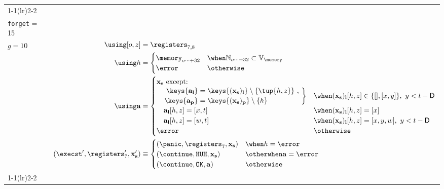 \begin{longtable}{p{3.5cm} p{12.5cm}}
  \cmidrule(lr){1-1}\cmidrule(lr){2-2}
  \makecell*[l]{
  $\Omega_F(\gascounter, \registers, \memory, (\mathbf{x}, \mathbf{y}), t)$ \\
  \texttt{forget} = 15 \\
  $g = 10$} &
  $\begin{aligned}
    \using [o, z] &= \registers_{7, 8} \\
    \using h &= \begin{cases}
      \memory_{o\dots+32} &\when \mathbb{N}_{o \dots+ 32} \subset \mathbb{V}_{\memory} \\
      \error &\otherwise
    \end{cases} \\
    \using \mathbf{a} &= \begin{cases}
      \mathbf{x}_\mathbf{s} \text{ except:} &\\
      \quad \left.
        \begin{aligned}
          \keys{\mathbf{a}_\mathbf{l}} &= \keys{(\mathbf{x}_\mathbf{s})_\mathbf{l}} \setminus \{\tup{h, z}\}\ ,\\[2pt]
          \keys{\mathbf{a}_\mathbf{p}} &= \keys{(\mathbf{x}_\mathbf{s})_\mathbf{p}} \setminus \{h\}
        \end{aligned}
      \ \right\} &\when (\mathbf{x}_\mathbf{s})_\mathbf{l}[h, z] \in \{[], [x, y]\},\ y < t - \mathsf{D} \\
      \quad \mathbf{a}_\mathbf{l}[h, z] = [x, t] &\when (\mathbf{x}_\mathbf{s})_\mathbf{l}[h, z] = [x] \\
      \quad \mathbf{a}_\mathbf{l}[h, z] = [w, t] &\when (\mathbf{x}_\mathbf{s})_\mathbf{l}[h, z] = [x, y, w],\ y < t - \mathsf{D} \\
      \error &\otherwise\\
    \end{cases} \\
    (\execst', \registers'_7, \mathbf{x}'_\mathbf{s}) &\equiv \begin{cases}
      (\panic, \registers_7, \mathbf{x}_\mathbf{s}) &\when h = \error \\
      (\continue, \mathtt{HUH}, \mathbf{x}_\mathbf{s}) &\otherwhen \mathbf{a} = \error \\
      (\continue, \mathtt{OK}, \mathbf{a}) &\otherwise \\
    \end{cases} \\
  \end{aligned}$\\
  \cmidrule(lr){1-1}\cmidrule(lr){2-2}

\end{longtable}
